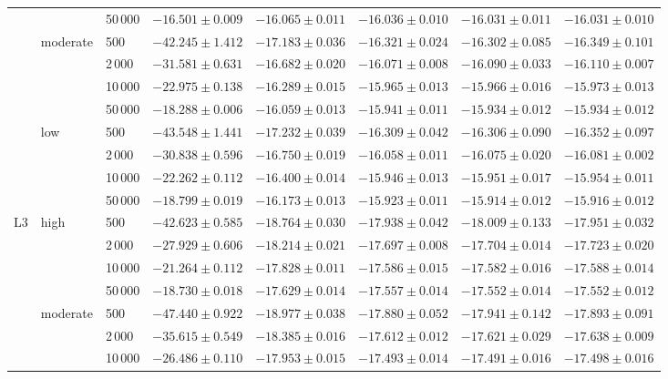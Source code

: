 \begin{tabular}{@{}lllrrrrr@{}}
 &  & 50\,000 & $-16.501 \pm 0.009$ & $-16.065 \pm 0.011$ & $-16.036 \pm 0.010$ & $-16.031 \pm 0.011$ & $-16.031 \pm 0.010$ \\
 & moderate & 500 & $-42.245 \pm 1.412$ & $-17.183 \pm 0.036$ & $-16.321 \pm 0.024$ & $-16.302 \pm 0.085$ & $-16.349 \pm 0.101$ \\
 &  & 2\,000 & $-31.581 \pm 0.631$ & $-16.682 \pm 0.020$ & $-16.071 \pm 0.008$ & $-16.090 \pm 0.033$ & $-16.110 \pm 0.007$ \\
 &  & 10\,000 & $-22.975 \pm 0.138$ & $-16.289 \pm 0.015$ & $-15.965 \pm 0.013$ & $-15.966 \pm 0.016$ & $-15.973 \pm 0.013$ \\
 &  & 50\,000 & $-18.288 \pm 0.006$ & $-16.059 \pm 0.013$ & $-15.941 \pm 0.011$ & $-15.934 \pm 0.012$ & $-15.934 \pm 0.012$ \\
 & low & 500 & $-43.548 \pm 1.441$ & $-17.232 \pm 0.039$ & $-16.309 \pm 0.042$ & $-16.306 \pm 0.090$ & $-16.352 \pm 0.097$ \\
 &  & 2\,000 & $-30.838 \pm 0.596$ & $-16.750 \pm 0.019$ & $-16.058 \pm 0.011$ & $-16.075 \pm 0.020$ & $-16.081 \pm 0.002$ \\
 &  & 10\,000 & $-22.262 \pm 0.112$ & $-16.400 \pm 0.014$ & $-15.946 \pm 0.013$ & $-15.951 \pm 0.017$ & $-15.954 \pm 0.011$ \\
 &  & 50\,000 & $-18.799 \pm 0.019$ & $-16.173 \pm 0.013$ & $-15.923 \pm 0.011$ & $-15.914 \pm 0.012$ & $-15.916 \pm 0.012$ \\
\addlinespace
L3 & high & 500 & $-42.623 \pm 0.585$ & $-18.764 \pm 0.030$ & $-17.938 \pm 0.042$ & $-18.009 \pm 0.133$ & $-17.951 \pm 0.032$ \\
 &  & 2\,000 & $-27.929 \pm 0.606$ & $-18.214 \pm 0.021$ & $-17.697 \pm 0.008$ & $-17.704 \pm 0.014$ & $-17.723 \pm 0.020$ \\
 &  & 10\,000 & $-21.264 \pm 0.112$ & $-17.828 \pm 0.011$ & $-17.586 \pm 0.015$ & $-17.582 \pm 0.016$ & $-17.588 \pm 0.014$ \\
 &  & 50\,000 & $-18.730 \pm 0.018$ & $-17.629 \pm 0.014$ & $-17.557 \pm 0.014$ & $-17.552 \pm 0.014$ & $-17.552 \pm 0.012$ \\
 & moderate & 500 & $-47.440 \pm 0.922$ & $-18.977 \pm 0.038$ & $-17.880 \pm 0.052$ & $-17.941 \pm 0.142$ & $-17.893 \pm 0.091$ \\
 &  & 2\,000 & $-35.615 \pm 0.549$ & $-18.385 \pm 0.016$ & $-17.612 \pm 0.012$ & $-17.621 \pm 0.029$ & $-17.638 \pm 0.009$ \\
 &  & 10\,000 & $-26.486 \pm 0.110$ & $-17.953 \pm 0.015$ & $-17.493 \pm 0.014$ & $-17.491 \pm 0.016$ & $-17.498 \pm 0.016$ \\

\end{tabular}
